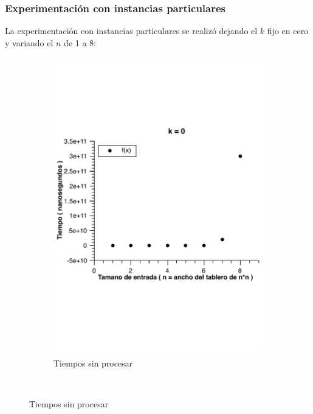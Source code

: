 \subsubsection{Experimentación con instancias particulares}

La experimentación con instancias particulares se realizó dejando el $k$ fijo en cero y variando el $n$ de 1 a 8:

\begin{figure}[H]
        \centering
        \begin{subfigure}[b]{0.5\textwidth}
                \includegraphics[width=\textwidth]{imagenes/grafico3-k-0-norm.pdf}
                \caption{Tiempos sin procesar}
        \end{subfigure}%
        ~ %

\end{figure}
